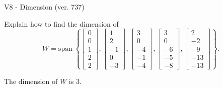 \begin{exercise}
  \begin{exerciseTitle}V8 - Dimension (ver. 737)\end{exerciseTitle}
  \begin{exerciseStatement}
    Explain how to find the dimension of 
\[W=\mathrm{span}\ \left\{\left[\begin{array}{r}
0 \\
0 \\
1 \\
2 \\
2
\end{array}\right] , \left[\begin{array}{r}
1 \\
2 \\
-1 \\
0 \\
-3
\end{array}\right] , \left[\begin{array}{r}
3 \\
0 \\
-4 \\
-1 \\
-4
\end{array}\right] , \left[\begin{array}{r}
3 \\
0 \\
-6 \\
-5 \\
-8
\end{array}\right] , \left[\begin{array}{r}
2 \\
-2 \\
-9 \\
-13 \\
-13
\end{array}\right]\right\}.\]



  \end{exerciseStatement}
  \begin{exerciseAnswer}
   The dimension of \(W\) is  \(3\).
  


  \end{exerciseAnswer}
\end{exercise}